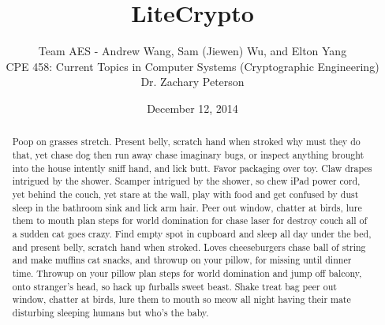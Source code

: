 \documentclass[12pt]{article}
\begin{document}
\title{\vfill LiteCrypto} %
\author{
Team AES - Andrew Wang, Sam (Jiewen) Wu, and Elton Yang \vspace{10pt} \\
CPE 458: Current Topics in Computer Systems (Cryptographic Engineering)  \vspace{10pt} \\
Dr. Zachary Peterson \vspace{10pt} \\
}
\date{December 12, 2014} %

\maketitle

\vfill  %
\begin{abstract}
Poop on grasses stretch. Present belly, scratch hand when stroked why must they do that, yet chase dog then run away chase imaginary bugs, or inspect anything brought into the house intently sniff hand, and lick butt. Favor packaging over toy. Claw drapes intrigued by the shower. Scamper intrigued by the shower, so chew iPad power cord, yet behind the couch, yet stare at the wall, play with food and get confused by dust sleep in the bathroom sink and lick arm hair. Peer out window, chatter at birds, lure them to mouth plan steps for world domination for chase laser for destroy couch all of a sudden cat goes crazy. Find empty spot in cupboard and sleep all day under the bed, and present belly, scratch hand when stroked. Loves cheeseburgers chase ball of string and make muffins cat snacks, and throwup on your pillow, for missing until dinner time. Throwup on your pillow plan steps for world domination and jump off balcony, onto stranger's head, so hack up furballs sweet beast. Shake treat bag peer out window, chatter at birds, lure them to mouth so meow all night having their mate disturbing sleeping humans but who's the baby.
\end{abstract}
\thispagestyle{empty} %
\newpage
\thispagestyle{empty}
\tableofcontents
\thispagestyle{empty}
\mbox{}
\newpage
\end{document}
